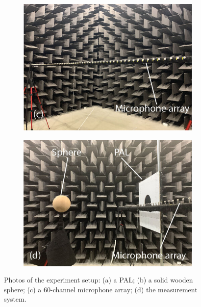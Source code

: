\begin{figure}[!htb]
\begin{subfigure}{0.45\textwidth}
        \includegraphics[width = \textwidth]{fig/array_resize.jpg}
    \end{subfigure}
    \begin{subfigure}{0.45\textwidth}
        \centering
        \includegraphics[width = \textwidth]{fig/system_resize.jpg}
    \end{subfigure}
    \caption{Photos of the experiment setup: (a) a PAL; (b) a solid wooden sphere; (c) a 60-channel microphone array; (d) the measurement system.}
    \label{fig:scat_exp_photo}
\end{figure}

